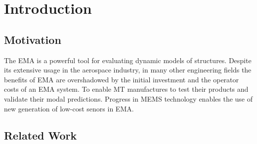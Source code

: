\setcounter{chapter}{0}

\chapter{Introduction}

\section{Motivation}
The \ac{EMA} is a powerful tool for evaluating dynamic models of structures. Despite its extensive usage in the aerospace industry, in many other engineering fields the benefits of \ac{EMA} are overshadowed by the initial investment and the operator costs of an \ac{EMA} system. To enable \ac{MT} manufactures to test their products and validate their modal predictions. Progress in \ac{MEMS} technology enables the use of new generation of low-cost senors in \ac{EMA}.

\section{Related Work}

